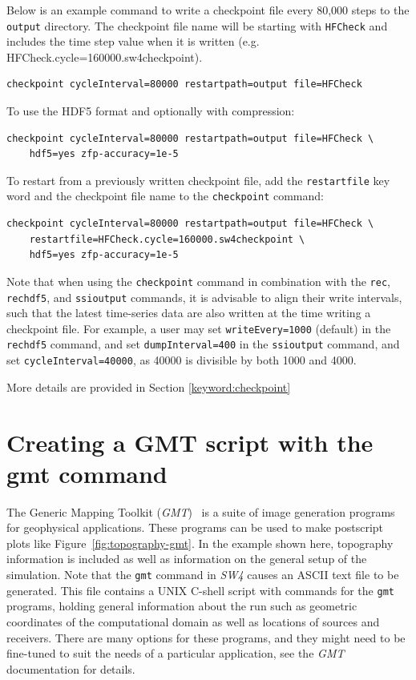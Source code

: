 \documentclass[11pt]{report}
\begin{document}
Below is an example command to write a checkpoint file every 80,000 steps to the \verb+output+ directory. The checkpoint file name will be starting with \verb+HFCheck+ and includes the time step value when it is written (e.g. HFCheck.cycle=160000.sw4checkpoint). 
\begin{verbatim}
checkpoint cycleInterval=80000 restartpath=output file=HFCheck
\end{verbatim}
To use the HDF5 format and optionally with compression:
\begin{verbatim}
checkpoint cycleInterval=80000 restartpath=output file=HFCheck \
    hdf5=yes zfp-accuracy=1e-5
\end{verbatim}

To restart from a previously written checkpoint file, add the \verb+restartfile+ key word and the checkpoint file name to the \verb+checkpoint+ command:
\begin{verbatim}
checkpoint cycleInterval=80000 restartpath=output file=HFCheck \
    restartfile=HFCheck.cycle=160000.sw4checkpoint \
    hdf5=yes zfp-accuracy=1e-5
\end{verbatim}

Note that when using the \verb+checkpoint+ command in combination with the \verb+rec+, \verb+rechdf5+, and  \verb+ssioutput+ commands, it is advisable to align their write intervals, such that the latest time-series data are also written at the time writing a checkpoint file. For example, a user may set  \verb+writeEvery=1000+ (default) in the \verb+rechdf5+ command, and set \verb+dumpInterval=400+ in the \verb+ssioutput+ command, and set \verb+cycleInterval=40000+, as 40000 is divisible by both 1000 and 4000.

More details are provided in Section \ref{keyword:checkpoint}

\section{Creating a GMT script with the gmt command}\label{sec:gmt}
The Generic Mapping Toolkit (\emph{GMT})~\cite{WesselSmithGMT} is a suite of image generation
programs for geophysical applications. These programs can be used to make postscript plots like
Figure~\ref{fig:topography-gmt}. In the example shown here, topography information is included as
well as information on the general setup of the simulation. Note that the {\tt gmt} command in
\emph{SW4} causes an ASCII text file to be generated. This file contains a UNIX C-shell script with
commands for the \verb+gmt+ programs, holding general information about the run such as geometric
coordinates of the computational domain as well as locations of sources and receivers. There are
many options for these programs, and they might need to be fine-tuned to suit the needs of a particular
application, see the \emph{GMT} documentation for details. 
\end{document}
